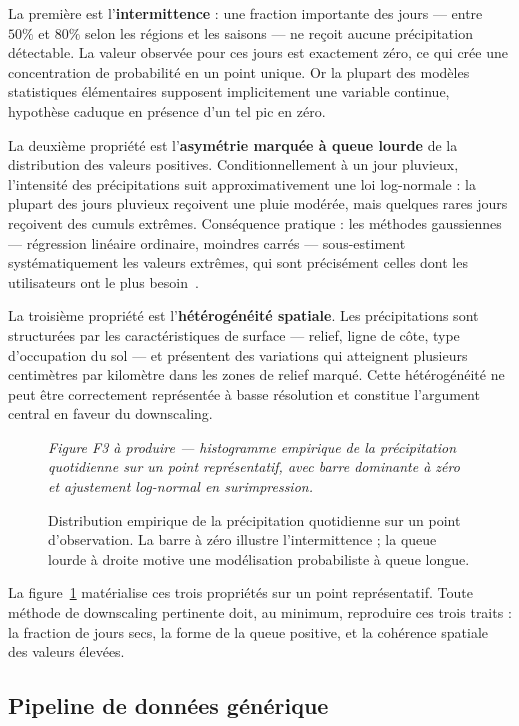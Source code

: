 \documentclass[14pt,a4paper,openany]{extreport}
\theoremstyle{definition}
\newcommand{\figplaceholder}[2][0.9\linewidth]{%
  \begin{tcolorbox}[width=#1,height=5cm,valign=center,colback=gray!8,colframe=gray!45,arc=2pt,boxrule=0.5pt]
    \centering\small\textit{#2}
  \end{tcolorbox}%
}
\begin{document}
La première est l'\textbf{intermittence} : une fraction importante des jours --- entre $50\%$ et $80\%$ selon les régions et les saisons --- ne reçoit aucune précipitation détectable. La valeur observée pour ces jours est exactement zéro, ce qui crée une concentration de probabilité en un point unique. Or la plupart des modèles statistiques élémentaires supposent implicitement une variable continue, hypothèse caduque en présence d'un tel pic en zéro.

La deuxième propriété est l'\textbf{asymétrie marquée à queue lourde} de la distribution des valeurs positives. Conditionnellement à un jour pluvieux, l'intensité des précipitations suit approximativement une loi log-normale : la plupart des jours pluvieux reçoivent une pluie modérée, mais quelques rares jours reçoivent des cumuls extrêmes. Conséquence pratique : les méthodes gaussiennes --- régression linéaire ordinaire, moindres carrés --- sous-estiment systématiquement les valeurs extrêmes, qui sont précisément celles dont les utilisateurs ont le plus besoin~\cite{maraun_widmann_2018}.

La troisième propriété est l'\textbf{hétérogénéité spatiale}. Les précipitations sont structurées par les caractéristiques de surface --- relief, ligne de côte, type d'occupation du sol --- et présentent des variations qui atteignent plusieurs centimètres par kilomètre dans les zones de relief marqué. Cette hétérogénéité ne peut être correctement représentée à basse résolution et constitue l'argument central en faveur du downscaling.

\begin{figure}[ht]
  \centering
  \figplaceholder[0.75\linewidth]{Figure F3 à produire --- histogramme empirique de la précipitation quotidienne sur un point représentatif, avec barre dominante à zéro et ajustement log-normal en surimpression.}
  \caption{Distribution empirique de la précipitation quotidienne sur un point d'observation. La barre à zéro illustre l'intermittence ; la queue lourde à droite motive une modélisation probabiliste à queue longue.}
  \label{fig:lognormal}
\end{figure}

La figure~\ref{fig:lognormal} matérialise ces trois propriétés sur un point représentatif. Toute méthode de downscaling pertinente doit, au minimum, reproduire ces trois traits : la fraction de jours secs, la forme de la queue positive, et la cohérence spatiale des valeurs élevées.

\subsection{Pipeline de données générique}
\label{ssec:pipeline}
\end{document}
